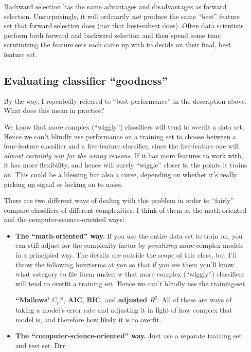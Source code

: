 Backward selection has the same advantages and disadvantages as forward
selection. Unsurprisingly, it will ordinarily \textit{not} produce the same
``best'' feature set that forward selection does (nor that best-subset does).
Often data scientists perform both forward and backward selection and then
spend some time scrutinizing the feature sets each came up with to decide on
their final, best feature set.

\subsection{Evaluating classifier ``goodness''}

By the way, I repeatedly referred to ``best performance'' in the description
above. What does this mean in practice? 

We know that more complex (``wiggly'') classifiers will tend to overfit a
data set. Hence we can't blindly use performance on a training set to choose
between a four-feature classifier and a five-feature classifier, since the
five-feature one will \textit{almost certainly win for the wrong reasons.} If
it has more features to work with, it has more flexibility, and hence will
surely ``wiggle'' closer to the points it trains on. This could be a blessing
but also a curse, depending on whether it's really picking up signal or
locking on to noise.

There are two different ways of dealing with this problem in order to
``fairly'' compare classifiers of different complexities. I think of them as
the math-oriented and the computer-science-oriented ways:

\begin{itemize}
\itemsep.1em

\item \textbf{The ``math-oriented'' way.} If you use the entire data set to
train on, you can still adjust for the complexity factor by
\textit{penalizing} more complex models in a principled way. The details are
outside the scope of this class, but I'll throw the following buzzterms at you
so that if you see them you'll know what category to file them under:
w that more complex (``wiggly'')
classifiers will tend to overfit a training set. Hence we can't blindly use
the training-set 

\textbf{``Mallows' $C_p$''}, \textbf{AIC}, \textbf{BIC}, and \textbf{adjusted
$R^2$}. All of these are ways of taking a model's error rate and adjusting it
in light of how complex that model is, and therefore how likely it is to
overfit.

\item \textbf{The ``computer-science-oriented'' way.} Just use a separate
training set and test set. Drr.

\end{itemize}


